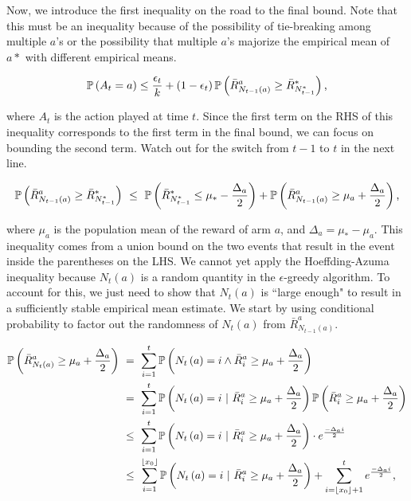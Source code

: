\documentclass[11pt]{article}
\begin{document}
\noindent Now, we introduce the first inequality on the road to the final bound. Note that this must be an inequality because of the possibility of tie-breaking among multiple $a$'s or the possibility that multiple $a$'s majorize the empirical mean of $a*$ with different empirical means.

\begin{align}
	\mathbb{P}\left( A_t = a \right) \leq \frac{\epsilon_t}{k} + \left( 1 - \epsilon_t \right) \mathbb{P}\left( \bar{R}_{N_{t-1}\left( a \right)}^a \geq \bar{R}_{N_{t-1}^*}^* \right) \textnormal{,} \label{line1}
\end{align}

\noindent where $A_t$ is the action played at time $t$. Since the first term on the RHS of this inequality corresponds to the first term in the final bound, we can focus on bounding the second term. Watch out for the switch from $t - 1$ to $t$ in the next line.

\begin{align}
	\mathbb{P}\left( \bar{R}_{N_{t-1}\left( a \right)}^a \geq \bar{R}_{N_{t-1}^*}^* \right)\ \leq\ \mathbb{P}\left( \bar{R}_{N_{t-1}^*}^* \leq \mu_* - \frac{\Delta_a}{2} \right) + \mathbb{P}\left( \bar{R}_{N_{t-1}\left( a \right)}^a \geq \mu_a + \frac{\Delta_a}{2} \right) \textnormal{,} \label{line2}
\end{align}

\noindent where $\mu_a$ is the population mean of the reward of arm $a$, and $\Delta_a = \mu_* - \mu_a$. This inequality comes from a union bound on the two events that result in the event inside the parentheses on the LHS. We cannot yet apply the Hoeffding-Azuma inequality because $N_t \left( a \right)$ is a random quantity in the $\epsilon$-greedy algorithm. To account for this, we just need to show that $N_t \left( a \right)$ is ``large enough" to result in a sufficiently stable empirical mean estimate. We start by using conditional probability to factor out the randomness of $N_t \left( a \right)$ from $\bar{R}_{N_{t-1}\left( a \right)}^a$.

\begin{align}
\prob{\bar{R}_{N_t\left( a \right)}^a \geq \mu_a + \frac{\Delta_a}{2}}\ &=\ \sum_{i=1}^t \prob{N_t \left( a \right) = i \land \bar{R}_i^a \geq \mu_a + \frac{\Delta_a}{2}} \label{line3}\\
&=\ \sum_{i=1}^t \prob{N_t \left( a \right) = i\ |\ \bar{R}_i^a \geq \mu_a + \frac{\Delta_a}{2}} \prob{\bar{R}_i^a \geq \mu_a + \frac{\Delta_a}{2}} \label{line4} \\ 
&\leq\ \sum_{i=1}^t \prob{N_t \left( a \right) = i\ |\ \bar{R}_i^a \geq \mu_a + \frac{\Delta_a}{2}} \cdot e^{\frac{-\Delta_a i}{2}} \label{line5}\\
&\leq\  \sum_{i=1}^{\lfloor x_0 \rfloor} \prob{N_t \left( a \right) = i\ |\ \bar{R}_i^a \geq \mu_a + \frac{\Delta_a}{2}} + \sum_{i = \lfloor x_0 \rfloor + 1}^t e^{\frac{-\Delta_a i}{2}} \textnormal{,} \label{line6}
\end{align}
\end{document}
